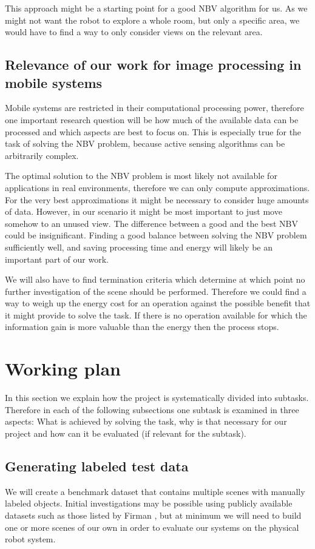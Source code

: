\documentclass[a4paper,11pt,english]{article}
\begin{document}
This approach might be a starting point for a good NBV algorithm for us. As we might not want the robot to explore a whole room, but only a specific area, we would have to find a way to only consider views on the relevant area.

\subsection{Relevance of our work for image processing in mobile systems}\label{relevanceimageprocessing}
Mobile systems are restricted in their computational processing power, therefore one important research question will be how much of the available data can be processed and which aspects are best to focus on. 
This is especially true for the task of solving the NBV problem, because active sensing algorithms can be arbitrarily complex.

The optimal solution to the NBV problem is most likely not available for applications in real environments, therefore we can only compute approximations.
For the very best approximations it might be necessary to consider huge amounts of data.
However, in our scenario it might be most important to just move somehow to an unused view. The difference between a good and the best NBV could be insignificant.
Finding a good balance between solving the NBV problem sufficiently well, and saving processing time and energy will likely be an important part of our work.

We will also have to find termination criteria which determine at which point no further investigation of the scene should be performed.
Therefore we could find a way to weigh up the energy cost for an operation against the possible benefit that it might provide to solve the task.
If there is no operation available for which the information gain is more valuable than the energy then the process stops.

\section{Working plan}\label{workingplan}
In this section we explain how the project is systematically divided into subtasks.
Therefore in each of the following subsections one subtask is examined in three aspects: What is achieved by solving the task, why is that necessary for our project and how can it be evaluated (if relevant for the subtask).

\subsection{Generating labeled test data}
We will create a benchmark dataset that contains multiple scenes with manually labeled objects. Initial investigations may be possible using publicly available datasets such as those listed by Firman \cite{firman2016}, but at minimum we will need to build one or more scenes of our own in order to evaluate our systems on the physical robot system.
\end{document}
